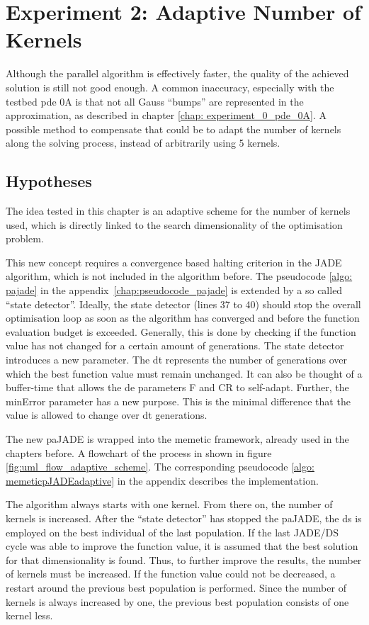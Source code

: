 \documentclass[./\jobname.tex]{subfiles}
\begin{document}
\chapter {Experiment 2: Adaptive Number of Kernels}
\label{chap:experimet_2}

Although the parallel algorithm is effectively faster, the quality of the achieved solution is still not good enough. A common inaccuracy, especially with the testbed \gls{pde} 0A is that not all Gauss ``bumps'' are represented in the approximation, as described in chapter \ref{chap: experiment_0_pde_0A}. A possible method to compensate that could be to adapt the number of kernels along the solving process, instead of arbitrarily using 5 kernels. 

\section{Hypotheses}

The idea tested in this chapter is an adaptive scheme for the number of kernels used, which is directly linked to the search dimensionality of the optimisation problem. 

This new concept requires a convergence based halting criterion in the JADE algorithm, which is not included in the algorithm before. The pseudocode \ref{algo: pajade} in the \mbox{appendix \ref{chap:pseudocode_pajade}} is extended by a so called ``state detector''. Ideally, the state detector (lines 37 to 40) should stop the overall optimisation loop as soon as the algorithm has converged and before the function evaluation budget is exceeded. Generally, this is done by checking if the function value has not changed for a certain amount of generations. The state detector introduces a new parameter. The \gls{dt} represents the number of generations over which the best function value must remain unchanged. It can also be thought of a buffer-time that allows the \gls{de} parameters F and CR to self-adapt. Further, the minError parameter has a new purpose. This is the minimal difference that the value is allowed to change over \gls{dt} generations. 

The new paJADE is wrapped into the memetic framework, already used in the chapters before. A flowchart of the process in shown in figure \ref{fig:uml_flow_adaptive_scheme}. The corresponding pseudocode \ref{algo: memeticpJADEadaptive} in the appendix describes the implementation.

The algorithm always starts with one kernel. From there on, the number of kernels is increased. After the ``state detector'' has stopped the paJADE, the \gls{ds} is employed on the best individual of the last population. If the last JADE/DS cycle was able to improve the function value, it is assumed that the best solution for that dimensionality is found. Thus, to further improve the results, the number of kernels must be increased. If the function value could not be decreased, a restart around the previous best population is performed. Since the number of kernels is always increased by one, the previous best population consists of one kernel less. 
\end{document}
